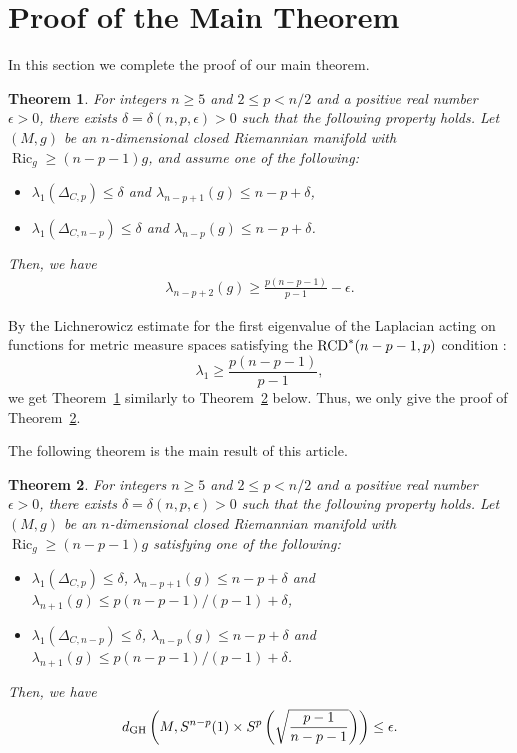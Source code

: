 \documentclass[10pt,a4paper]{amsart}
\numberwithin{equation}{section}
\newtheorem{Thm}{Theorem}[section]
\theoremstyle{definition}
\newcommand{\Ric}{\operatorname{Ric}}
\newcommand{\RCD}{{\rm RCD}^\ast}
\begin{document}
\section{Proof of the Main Theorem}
In this section we complete the proof of our main theorem.
\begin{Thm}\label{n-p+2}
For integers $n\geq 5$ and $2\leq p < n/2$ and a positive real number $\epsilon>0$, there exists $\delta=\delta(n,p,\epsilon)>0$ such that the following property holds.
Let $(M,g)$ be an $n$-dimensional closed Riemannian manifold with $\Ric_g\geq (n-p-1)g$, and assume one of the following:
\begin{itemize}\itemsep=0pt
\item $\lambda_1(\Delta_{C,p})\leq \delta$ and $\lambda_{n-p+1}(g)\leq n-p+\delta$,
\item $\lambda_1(\Delta_{C,n-p})\leq \delta$ and $\lambda_{n-p}(g)\leq n-p+\delta$.
\end{itemize}
Then, we have
\begin{gather*}
\lambda_{n-p+2}(g)\geq \frac{p(n-p-1)}{p-1}-\epsilon.
\end{gather*}
\end{Thm}
By the Lichnerowicz estimate for the first eigenvalue of the Laplacian acting on functions for metric measure spaces satisfying the $\RCD(n-p-1,p)$ condition \cite[Theorem~4.22]{EKS}:
\[
\lambda_1\geq \frac{p(n-p-1)}{p-1},
\]
we get Theorem~\ref{n-p+2} similarly to Theorem~\ref{mthm} below.
Thus, we only give the proof of Theorem~\ref{mthm}.

The following theorem is the main result of this article.

\begin{Thm}\label{mthm}
For integers $n\geq 5$ and $2\leq p < n/2$ and a positive real number $\epsilon>0$, there exists $\delta=\delta(n,p,\epsilon)>0$ such that the following property holds.
Let $(M,g)$ be an $n$-dimensional closed Riemannian manifold with $\Ric_g\geq (n-p-1)g$
satisfying one of the following:
\begin{itemize}\itemsep=0pt
\item $\lambda_1(\Delta_{C,p})\leq \delta$, $\lambda_{n-p+1}(g)\leq n-p+\delta$ and $\lambda_{n+1}(g)\leq p(n-p-1)/(p-1)+\delta$,
\item $\lambda_1(\Delta_{C,n-p})\leq \delta$, $\lambda_{n-p}(g)\leq n-p+\delta$ and $\lambda_{n+1}(g)\leq p(n-p-1)/(p-1)+\delta$.
\end{itemize}
Then, we have
\[d_{{\rm GH}}\left(M,S^{n-p}(1)\times S^p\left(\sqrt{\frac{p-1}{n-p-1}}\right)\right)\leq \epsilon.\]
\end{Thm}
\end{document}
